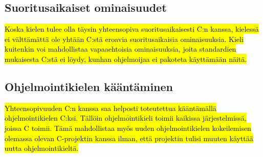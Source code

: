 \subsection{Suoritusaikaiset ominaisuudet}

\hl{Koska kielen tulee olla täysin yhteensopiva suoritusaikaisesti C:n kanssa,
kielessä ei välttämättä ole yhtään C:stä eroavia suoritusaikaisia
ominaisuuksia. Kieli kuitenkin voi mahdollistaa vapaaehtoisia ominaisuuksia,
joita standardien mukaisesta C:stä ei löydy, kunhan ohjelmoijaa ei pakoteta
käyttämään näitä.}

\subsection{Ohjelmointikielen kääntäminen}

\hl{Yhteensopivuuden C:n kanssa saa helposti toteutettua kääntämällä
ohjelmointikielen C:ksi. Tällöin ohjelmointikieli toimii kaikissa
järjestelmissä, joissa C toimii. Tämä mahdollistaa myös uuden ohjelmointikielen
kokeilemisen olemassa olevan C-projektin kanssa ilman, että projektin tulisi
muuten käyttää uutta ohjelmointikieltä.}
